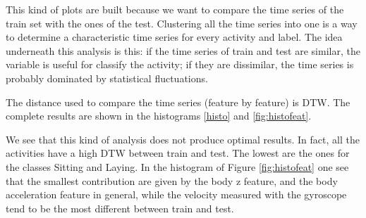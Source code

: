 \documentclass[10pt, a4paper, twocolumn]{article}
\begin{document}

This kind of plots are built because we want to compare the time series of the train set with the ones of the test. Clustering all the time series into one is a way to determine a characteristic time series for every activity and label. The idea underneath this analysis is this: if the time series of train and test are similar, the variable is useful for classify the activity; if they are dissimilar, the time series is probably dominated by statistical fluctuations.

The distance used to compare the time series (feature by feature) is DTW. The complete results are shown in the histograms \ref{histo} and \ref{fig:histofeat}. 

We see that this kind of analysis does not produce optimal results. In fact, all the activities have a high DTW between train and test. The lowest are the ones for the classes Sitting and Laying. In the histogram of Figure \ref{fig:histofeat} one see that the smallest contribution are given by the body z feature, and the body acceleration feature in general, while the velocity measured with the gyroscope tend to be the most different between train and test. 
\end{document}
